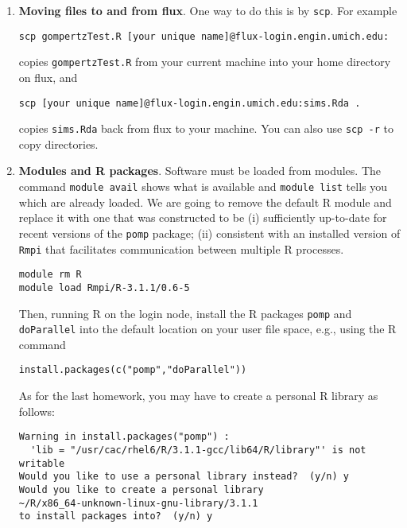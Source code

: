 \documentclass[12pt]{article}
\begin{document}
\begin{enumerate}
\item {\bf Moving files to and from flux}. One way to do this is by \texttt{scp}. For example
\begin{verbatim}
scp gompertzTest.R [your unique name]@flux-login.engin.umich.edu:
\end{verbatim}
copies \texttt{gompertzTest.R} from your current machine into your home directory on flux, and
\begin{verbatim}
scp [your unique name]@flux-login.engin.umich.edu:sims.Rda .
\end{verbatim}
copies \texttt{sims.Rda} back from flux to your machine. You can also use \texttt{scp -r} to copy directories.


\item {\bf Modules and R packages}. Software must be loaded from modules. The command \texttt{module avail} shows what is available and \texttt{module list} tells you which are already loaded. We are going to remove the default R module and replace it with one that was constructed to be (i) sufficiently up-to-date for recent versions of the \texttt{pomp} package; (ii) consistent with an installed version of \texttt{Rmpi} that facilitates communication between multiple R processes.
\begin{verbatim}
module rm R
module load Rmpi/R-3.1.1/0.6-5
\end{verbatim}
Then, running R on the login node, install the R packages \texttt{pomp} and \texttt{doParallel} into the default location on your user file space, e.g., using the R command
\begin{verbatim}
install.packages(c("pomp","doParallel"))
\end{verbatim}
As for the last homework, you may have to create a personal R library as follows:
\begin{verbatim}
Warning in install.packages("pomp") :
  'lib = "/usr/cac/rhel6/R/3.1.1-gcc/lib64/R/library"' is not writable
Would you like to use a personal library instead?  (y/n) y
Would you like to create a personal library
~/R/x86_64-unknown-linux-gnu-library/3.1.1
to install packages into?  (y/n) y
\end{verbatim}


\end{enumerate}
\end{document}
